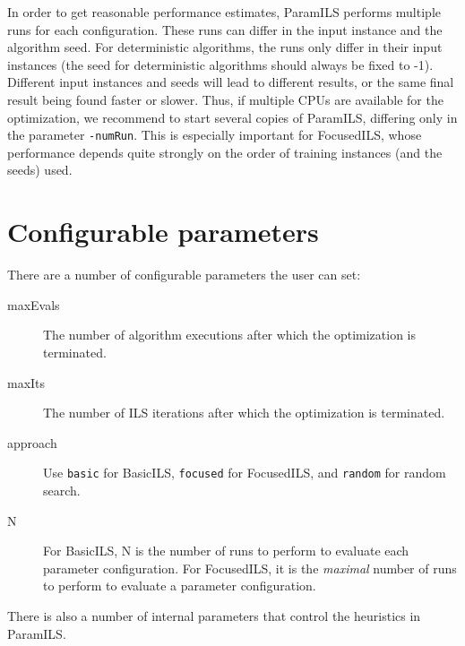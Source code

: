 \documentclass[10pt,letterpaper,twoside]{article}
\begin{document}
In order to get reasonable performance estimates, ParamILS performs multiple runs for each configuration.
These runs can differ in the input instance and the algorithm seed. For deterministic algorithms,
the runs only differ in their input instances (the seed for deterministic algorithms should always be fixed to -1).
Different input instances and seeds will lead to different results, or the same final result being found faster or slower. 
Thus, if multiple CPUs are available for the optimization, we recommend to start several copies of ParamILS,
differing only in the parameter \texttt{-numRun}. This is especially important for FocusedILS, whose performance
depends quite strongly on the order of training instances (and the seeds) used.

\section{Configurable parameters}

\noindent{}There are a number of configurable parameters the user can set:

\begin{description}
	\item[maxEvals] The number of algorithm executions after which the optimization is terminated.
	\item[maxIts] The number of ILS iterations after which the optimization is terminated.
	\item[approach] Use \texttt{basic} for BasicILS, \texttt{focused} for FocusedILS, and \texttt{random} for random search.
	\item[N] For BasicILS, N is the number of runs to perform to evaluate each parameter configuration. For FocusedILS, it is the \emph{maximal} number of runs to perform to evaluate a parameter configuration.
\end{description}

There is also a number of internal parameters that control the heuristics in ParamILS.
\end{document}
